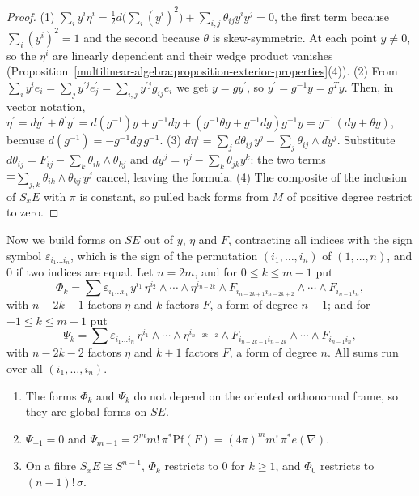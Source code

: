 \begin{proof}
(1) $\sum_iy^i\eta^i = \frac12d\bigl(\sum_i(y^i)^2\bigr) + \sum_{i,j}\theta_{ij}y^iy^j = 0$, the first term because $\sum_i(y^i)^2 = 1$ and the second because $\theta$ is skew-symmetric.
At each point $y \neq 0$, so the $\eta^i$ are linearly dependent and their wedge product vanishes (Proposition~\ref{multilinear-algebra:proposition-exterior-properties}(4)).
(2) From $\sum_iy^ie_i = \sum_jy^{\prime j}e^{\prime}_j = \sum_{i,j}y^{\prime j}g_{ij}e_i$ we get $y = gy^{\prime}$, so $y^{\prime} = g^{-1}y = g^Ty$. Then, in vector notation,
$\eta^{\prime} = dy^{\prime} + \theta^{\prime}y^{\prime} = d(g^{-1})y + g^{-1}dy + (g^{-1}\theta g + g^{-1}dg)g^{-1}y = g^{-1}(dy + \theta y)$, because $d(g^{-1}) = -g^{-1}dg\,g^{-1}$.
(3) $d\eta^i = \sum_jd\theta_{ij}\,y^j - \sum_j\theta_{ij} \wedge dy^j$. Substitute $d\theta_{ij} = F_{ij} - \sum_k\theta_{ik} \wedge \theta_{kj}$ and $dy^j = \eta^j - \sum_k\theta_{jk}y^k$:
the two terms $\mp\sum_{j,k}\theta_{ik} \wedge \theta_{kj}\,y^j$ cancel, leaving the formula.
(4) The composite of the inclusion of $S_xE$ with $\pi$ is constant, so pulled back forms from $M$ of positive degree restrict to zero.
\end{proof}

Now we build forms on $SE$ out of $y$, $\eta$ and $F$, contracting all indices with the sign symbol $\varepsilon_{i_1 \ldots i_n}$, which is the sign of the permutation $(i_1, \ldots, i_n)$ of
$(1, \ldots, n)$, and $0$ if two indices are equal. Let $n = 2m$, and for $0 \leq k \leq m - 1$ put
\[
\Phi_k = \sum\varepsilon_{i_1 \ldots i_n}\,y^{i_1}\,\eta^{i_2} \wedge \cdots \wedge \eta^{i_{n-2k}} \wedge F_{i_{n-2k+1}i_{n-2k+2}} \wedge \cdots \wedge F_{i_{n-1}i_n},
\]
with $n - 2k - 1$ factors $\eta$ and $k$ factors $F$, a form of degree $n - 1$; and for $-1 \leq k \leq m - 1$ put
\[
\Psi_k = \sum\varepsilon_{i_1 \ldots i_n}\,\eta^{i_1} \wedge \cdots \wedge \eta^{i_{n-2k-2}} \wedge F_{i_{n-2k-1}i_{n-2k}} \wedge \cdots \wedge F_{i_{n-1}i_n},
\]
with $n - 2k - 2$ factors $\eta$ and $k + 1$ factors $F$, a form of degree $n$. All sums run over all $(i_1, \ldots, i_n)$.

\begin{lemma}\label{characteristic-classes:lemma-chern-forms}
\begin{enumerate}
\item The forms $\Phi_k$ and $\Psi_k$ do not depend on the oriented orthonormal frame, so they are global forms on $SE$.
\item $\Psi_{-1} = 0$ and $\Psi_{m-1} = 2^mm!\,\pi^*\mathrm{Pf}(F) = (4\pi)^mm!\,\pi^*e(\nabla)$.
\item On a fibre $S_xE \cong S^{n-1}$, $\Phi_k$ restricts to $0$ for $k \geq 1$, and $\Phi_0$ restricts to $(n-1)!\,\sigma$.
\end{enumerate}
\end{lemma}

